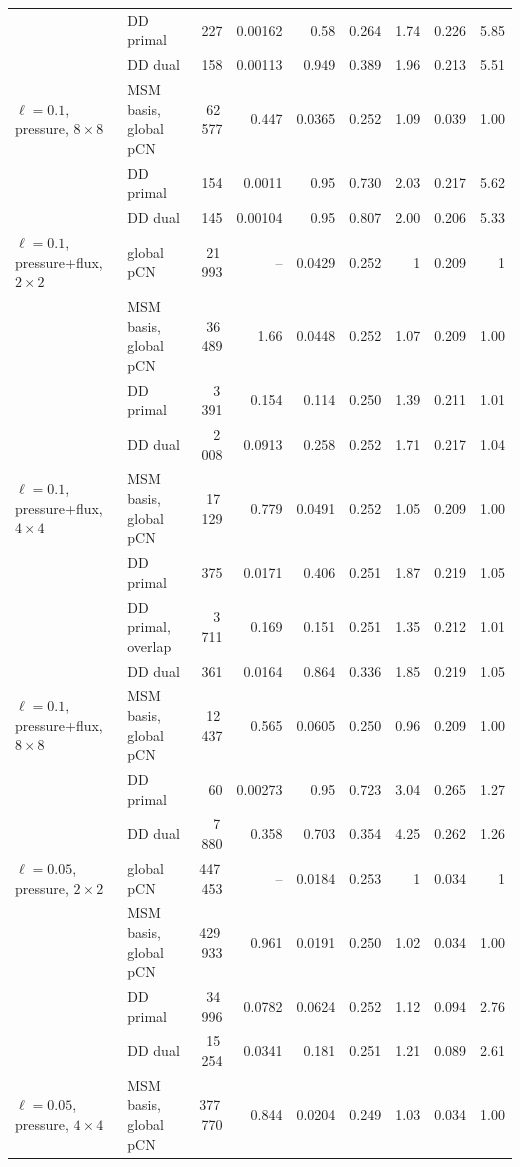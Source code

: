 \begin{tabular}{llrrrrrrr}
 & DD primal & 227 & 0.00162 & 0.58 & 0.264 & 1.74 & 0.226 & 5.85 \\
 & DD dual & 158 & 0.00113 & 0.949 & 0.389 & 1.96 & 0.213 & 5.51 \\
\addlinespace
$\ell=0.1$, pressure, $8\times8$ & MSM basis, global pCN & 62\,577 & 0.447 & 0.0365 & 0.252 & 1.09 & 0.039 & 1.00 \\
 & DD primal & 154 & 0.0011 & 0.95 & 0.730 & 2.03 & 0.217 & 5.62 \\
 & DD dual & 145 & 0.00104 & 0.95 & 0.807 & 2.00 & 0.206 & 5.33 \\
\addlinespace
$\ell=0.1$, pressure+flux, $2\times2$ & global pCN & 21\,993 & -- & 0.0429 & 0.252 & 1 & 0.209 & 1 \\
 & MSM basis, global pCN & 36\,489 & 1.66 & 0.0448 & 0.252 & 1.07 & 0.209 & 1.00 \\
 & DD primal & 3\,391 & 0.154 & 0.114 & 0.250 & 1.39 & 0.211 & 1.01 \\
 & DD dual & 2\,008 & 0.0913 & 0.258 & 0.252 & 1.71 & 0.217 & 1.04 \\
\addlinespace
$\ell=0.1$, pressure+flux, $4\times4$ & MSM basis, global pCN & 17\,129 & 0.779 & 0.0491 & 0.252 & 1.05 & 0.209 & 1.00 \\
 & DD primal & 375 & 0.0171 & 0.406 & 0.251 & 1.87 & 0.219 & 1.05 \\
 & DD primal, overlap & 3\,711 & 0.169 & 0.151 & 0.251 & 1.35 & 0.212 & 1.01 \\
 & DD dual & 361 & 0.0164 & 0.864 & 0.336 & 1.85 & 0.219 & 1.05 \\
\addlinespace
$\ell=0.1$, pressure+flux, $8\times8$ & MSM basis, global pCN & 12\,437 & 0.565 & 0.0605 & 0.250 & 0.96 & 0.209 & 1.00 \\
 & DD primal & 60 & 0.00273 & 0.95 & 0.723 & 3.04 & 0.265 & 1.27 \\
 & DD dual & 7\,880 & 0.358 & 0.703 & 0.354 & 4.25 & 0.262 & 1.26 \\
\addlinespace
$\ell=0.05$, pressure, $2\times2$ & global pCN & 447\,453 & -- & 0.0184 & 0.253 & 1 & 0.034 & 1 \\
 & MSM basis, global pCN & 429\,933 & 0.961 & 0.0191 & 0.250 & 1.02 & 0.034 & 1.00 \\
 & DD primal & 34\,996 & 0.0782 & 0.0624 & 0.252 & 1.12 & 0.094 & 2.76 \\
 & DD dual & 15\,254 & 0.0341 & 0.181 & 0.251 & 1.21 & 0.089 & 2.61 \\
\addlinespace
$\ell=0.05$, pressure, $4\times4$ & MSM basis, global pCN & 377\,770 & 0.844 & 0.0204 & 0.249 & 1.03 & 0.034 & 1.00 \\

\end{tabular}
